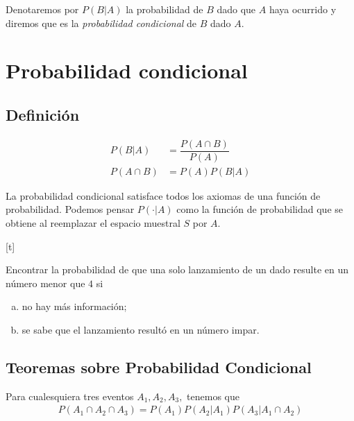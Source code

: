   Denotaremos por $P(B|A)$
 la probabilidad de $B$ dado que $A$ haya ocurrido y diremos que es la \emph{probabilidad condicional} de $B$ dado $A.$


 \section{Probabilidad condicional}

 \subsection{Definición}

{}
\begin{defn}
 \begin{align}
  P(B|A)&=\dfrac{P(A\cap B)}{P(A)} \\
  P(A\cap B) &= P(A)P(B|A)
 \end{align}
\end{defn}


{}
\begin{rem}
 La probabilidad condicional satisface todos los axiomas de una función de probabilidad.  Podemos pensar $P(\cdot|A)$ como la función de probabilidad que se obtiene al reemplazar el espacio muestral $S$ por $A.$
\end{rem}


[t]{}
\begin{ejemplo}
 \label{exmp:0.1.13}
 Encontrar la probabilidad de que una solo lanzamiento de un dado resulte en un número menor que $4$ si
 \begin{enumerate}[(a)]
  \item no hay más información; 
  \item se sabe que el lanzamiento resultó en un número impar.
 \end{enumerate}

\end{ejemplo}


\subsection{Teoremas sobre Probabilidad Condicional}
{}
\begin{thm}
 \label{thm:0.1.9}
 Para cualesquiera tres eventos $A_{1},A_{2},A_{3},$ tenemos que
 \begin{align}
  \label{eq:0.1.19}
  P(A_{1} \cap A_{2} \cap A_{3})=P(A_{1})P(A_{2}|A_{1})P(A_{3}|A_{1} \cap A_{2})
 \end{align}
\end{thm}


